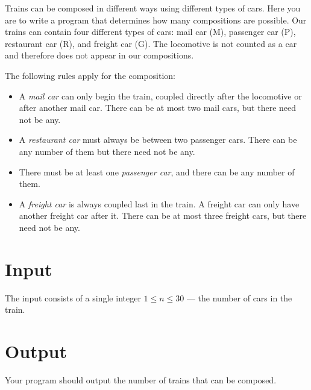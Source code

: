 
Trains can be composed in different ways using different types of cars. Here you are to write a program that determines how many compositions are possible. Our trains can contain four different types of cars: mail car (M), passenger car (P), restaurant car (R), and freight car (G). The locomotive is not counted as a car and therefore does not appear in our compositions.

The following rules apply for the composition:
\begin{itemize}
\item A \emph{mail car} can only begin the train, coupled directly after the locomotive or after another mail car. There can be at most two mail cars, but there need not be any.
\item A \emph{restaurant car} must always be between two passenger cars. There can be any number of them but there need not be any.
\item There must be at least one \emph{passenger car}, and there can be any number of them.
\item A \emph{freight car} is always coupled last in the train. A freight car can only have another freight car after it. There can be at most three freight cars, but there need not be any.
\end{itemize}

\section*{Input}
The input consists of a single integer $1 \le n \le 30$ --- the number of cars in the train.

\section*{Output}
Your program should output the number of trains that can be composed.
